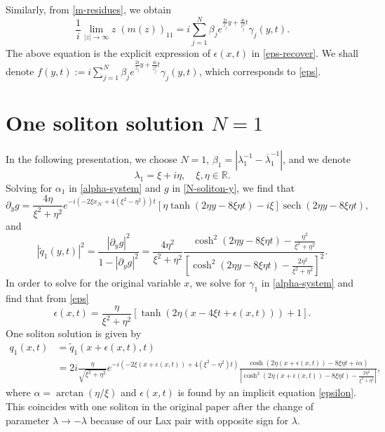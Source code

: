 \documentclass[11pt]{article}
\newcommand{\RR}{{\mathbb R}}
\newcommand{\HH}{\mathcal{H}}
\DeclareMathOperator{\sech}{sech}
\DeclareMathOperator{\Tanh}{tanh}
\begin{document}
 Similarly, from \eqref{m-residues}, we obtain  
 $$\frac{1}{i}\lim_{|z|\rightarrow \infty} z\; (m(z))_{11}=i\sum_{j=1}^N\beta_j e^{\frac{2i}{z_j}y+\frac{4i}{z_j^2}t}\gamma_j(y,t).$$ 
 The above equation is the explicit expression of $\epsilon(x,t)$ in \eqref{eps-recover}.
 We shall denote $f(y,t):= i\sum_{j=1}^N\beta_j e^{\frac{2i}{z_j}y+\frac{4i}{z_j^2}t}\gamma_j(y,t)$, which corresponds to \eqref{eps}.   
  
\section{One soliton solution $N=1$} \label{one-soliton-example}
In the following presentation, we choose $N=1$, $\beta_1=|\lambda_1^{-1}-\overline{\lambda}_1^{-1}|$, and we denote
$$\lambda_1=\xi+i\eta, \quad \xi, \eta \in \RR.$$ 
Solving for $\alpha_1$ in \eqref{alpha-system} and $g$ in \eqref{N-soliton-y}, we find that  
$$\partial_{y}g= \frac{4\eta}{\xi^2+\eta^2}e^{-i(-2\xi x_{\HH}+4(\xi^2-\eta^2))t} [\eta \Tanh(2\eta y-8\xi\eta t)-i\xi]\sech(2\eta y-8\xi\eta t),$$
and
\begin{equation}\label{q1-mag}
|\tilde{q}_{1}(y,t)|^2=\frac{|\partial_yg|^2}{1-|\partial_yg|^2}=\frac{4\eta^2}{\xi^2+\eta^2}\frac{\cosh^2(2\eta y-8\xi\eta t)-\frac{\eta^2}{\xi^2+\eta^2}}{[\cosh^2(2\eta y-8\xi\eta t)-\frac{2\eta^2}{\xi^2+\eta^2}]^2}.
\end{equation}
In order to solve for the original variable $x$, we solve for $\gamma_1$ in \eqref{alpha-system} and find that from \eqref{eps}
\begin{equation} \label{epsilon}
\epsilon(x,t)=\frac{\eta}{\xi^2+\eta^2}\left[\tanh(2\eta(x-4\xi t+\epsilon(x,t)))+1\right].
\end{equation}
One soliton solution is given by
\begin{align}
q_1(x,t) &= \tilde{q}_1(x+\epsilon(x,t),t) \nonumber\\
\label{one-soliton} &=2i\frac{\eta}{\sqrt{\xi^2+\eta^2}}e^{-i(-2\xi (x+\epsilon(x,t))+4(\xi^2-\eta^2)t)} \frac{ \cosh(2\eta (x+\epsilon(x,t))-8\xi\eta t+i\alpha)}{\left|\cosh^2(2\eta (x+\epsilon(x,t))-8\xi\eta t)-\frac{2\eta^2}{\xi^2+\eta^2}\right|},
\end{align}
where $\alpha= \arctan(\eta/\xi)$ and $\epsilon(x,t)$ is found by an implicit equation \eqref{epsilon}.
 This coincides with one soliton in the original paper \cite{Shimizu-Wadati-1980} after the change of parameter $\lambda \rightarrow -\lambda$ because of our Lax pair with opposite sign for $\lambda$. 
 
\end{document}
